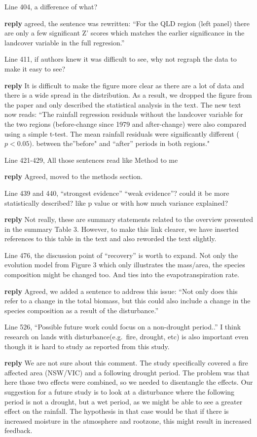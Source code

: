 \documentclass[fleqn,10pt,lineno]{wlpeerj} %
\theoremstyle{definition}
\theoremstyle{definition}
\theoremstyle{definition}
\theoremstyle{remark}
\begin{document}
Line 404, a difference of what?

\textbf{reply} agreed, the sentence was rewritten: ``For the QLD region
(left panel) there are only a few significant Z' scores which matches
the earlier significance in the landcover variable in the full
regresion.''

Line 411, if authors knew it was difficult to see, why not regraph the
data to make it easy to see?

\textbf{reply} It is difficult to make the figure more clear as there
are a lot of data and there is a wide spread in the distribution. As a
result, we dropped the figure from the paper and only described the
statistical analysis in the text. The new text now reads: ``The rainfall
regression residuals without the landcover variable for the two regions
(before-change since 1979 and after-change) were also compared using a
simple t-test. The mean rainfall residuals were significantly different
(\(p < 0.05\)). between the''before" and ``after'' periods in both
regions."

Line 421-429, All those sentences read like Method to me

\textbf{reply} Agreed, moved to the methods section.

Line 439 and 440, ``strongest evidence'' ``weak evidence''? could it be
more statistically described? like p value or with how much variance
explained?

\textbf{reply} Not really, these are summary statements related to the
overview presented in the summary Table 3. However, to make this link
clearer, we have inserted references to this table in the text and also
reworded the text slightly.

Line 476, the discussion point of ``recovery'' is worth to expand. Not
only the evolution model from Figure 3 which only illustrates the
mass/area, the species composition might be changed too. And ties into
the evapotranspiration rate.

\textbf{reply} Agreed, we added a sentence to address this issue: ``Not
only does this refer to a change in the total biomass, but this could
also include a change in the species composition as a result of the
disturbance.''

Line 526, ``Possible future work could focus on a non-drought period..''
I think research on lands with disturbance(e.g.~fire, drought, etc) is
also important even though it is hard to study as reported from this
study.

\textbf{reply} We are not sure about this comment. The study
specifically covered a fire affected area (NSW/VIC) and a following
drought period. The problem was that here those two effects were
combined, so we needed to disentangle the effects. Our suggestion for a
future study is to look at a disturbance where the following period is
not a drought, but a wet period, as we might be able to see a greater
effect on the rainfall. The hypothesis in that case would be that if
there is increased moisture in the atmosphere and rootzone, this might
result in increased feedback.
\end{document}
